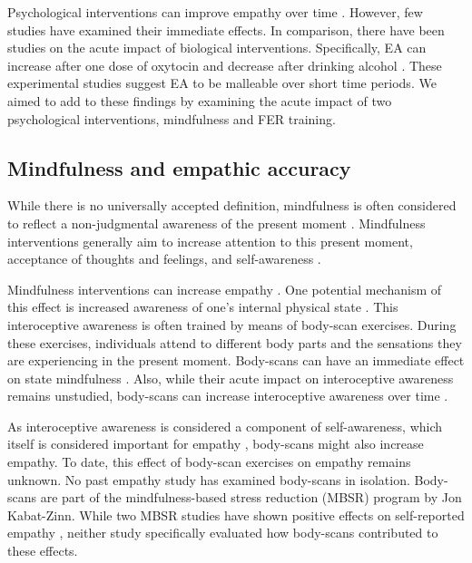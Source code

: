 \documentclass[authordate, empirical, issue]{jote-new-article}
\begin{document}
Psychological interventions can improve empathy over time \parencites{Birnie2010}{Lam2011}{Mascaro2013}. However, few studies have examined their immediate effects. In comparison, there have been studies on the acute impact of biological interventions. Specifically, EA can increase after one dose of oxytocin \parencites{Bartz2010} and decrease after drinking alcohol \parencites{Thiel2018}. These experimental studies suggest EA to be malleable over short time periods. We aimed to add to these findings by examining the acute impact of two psychological interventions, mindfulness and FER training.



\subsection{Mindfulness and empathic accuracy}



While there is no universally accepted definition, mindfulness is often considered to reflect a non-judgmental awareness of the present moment \parencites{Bishop2004}. Mindfulness interventions generally aim to increase attention to this present moment, acceptance of thoughts and feelings, and self-awareness \parencites{Sauer-Zavala2013}.



Mindfulness interventions can increase empathy \parencites{Lam2011}. One potential mechanism of this effect is increased awareness of one's internal physical state \parencites{Birnie2010}{Fischer2017}{Sauer-Zavala2013}{Shapiro1998}. This interoceptive awareness is often trained by means of body-scan exercises. During these exercises, individuals attend to different body parts and the sensations they are experiencing in the present moment. Body-scans can have an immediate effect on state mindfulness \parencites{Upton2019}. Also, while their acute impact on interoceptive awareness remains unstudied, body-scans can increase interoceptive awareness over time \parencites{Fischer2017}.



As interoceptive awareness is considered a component of self-awareness, which itself is considered important for empathy \parencites{Gallup2002}, body-scans might also increase empathy. To date, this effect of body-scan exercises on empathy remains unknown. No past empathy study has examined body-scans in isolation. Body-scans are part of the mindfulness-based stress reduction (MBSR) program by Jon Kabat-Zinn. While two MBSR studies have shown positive effects on self-reported empathy \parencites{Birnie2010}{Shapiro1998}, neither study specifically evaluated how body-scans contributed to these effects.
\end{document}
